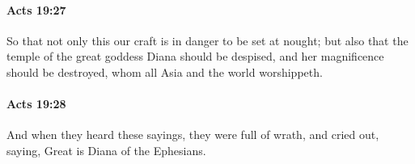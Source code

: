 		\paragraph{Acts 19:27} %
			\label{ACTS-19-27}

			So that not only this our craft is in danger to be set at nought; but also that the temple of the great goddess Diana should be despised, and her magnificence should be destroyed, whom all Asia and the world worshippeth.

			\begin{framed}
			\scriptsize
				\begin{compactdesc}
					\item[SBLG] 
				\end{compactdesc}
			\end{framed}

		\paragraph{Acts 19:28} %
			\label{ACTS-19-28}

			And when they heard these sayings, they were full of wrath, and cried out, saying, Great is Diana of the Ephesians.

